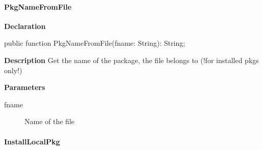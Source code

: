\documentclass{report}
\newif\ifpdf
\begin{document}
\paragraph*{PkgNameFromFile}\hspace*{\fill}

\label{packagekit.TPackageKit-PkgNameFromFile}
\begin{list}{}{
\setlength{\itemindent}{0cm}
\setlength{\listparindent}{0cm}
\setlength{\leftmargin}{\evensidemargin}
\addtolength{\leftmargin}{\tmplength}
\settowidth{\labelsep}{X}
\addtolength{\leftmargin}{\labelsep}
\setlength{\labelwidth}{\tmplength}
}
\item[\textbf{Declaration}\hfill]
\ifpdf
\begin{flushleft}
\fi
\begin{ttfamily}
public function PkgNameFromFile(fname: String): String;\end{ttfamily}

\ifpdf
\end{flushleft}
\fi

\par
\item[\textbf{Description}]
Get the name of the package, the file belongs to (!for installed pkgs only!) \par
\item[\textbf{Parameters}]
\begin{description}
\item[fname] Name of the file
\end{description}


\end{list}
\paragraph*{InstallLocalPkg}\hspace*{\fill}
\end{document}
